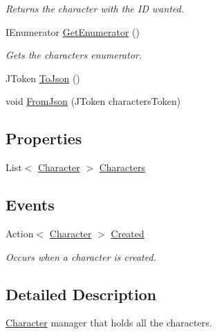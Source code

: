\begin{DoxyCompactItemize}
\begin{DoxyCompactList}\small\item\em Returns the character with the ID wanted. \end{DoxyCompactList}\item 
I\+Enumerator \hyperlink{class_project_porcupine_1_1_entities_1_1_character_manager_a2d75bb0449e9a7e74e43a1a9f4c91b10}{Get\+Enumerator} ()
\begin{DoxyCompactList}\small\item\em Gets the characters enumerator. \end{DoxyCompactList}\item 
J\+Token \hyperlink{class_project_porcupine_1_1_entities_1_1_character_manager_aa12ac490f3e9f2197831e50f291b50a3}{To\+Json} ()
\item 
void \hyperlink{class_project_porcupine_1_1_entities_1_1_character_manager_a06bf7980cdec23a5939d03f196839ccb}{From\+Json} (J\+Token characters\+Token)
\end{DoxyCompactItemize}
\subsection*{Properties}
\begin{DoxyCompactItemize}
\item 
List$<$ \hyperlink{class_project_porcupine_1_1_entities_1_1_character}{Character} $>$ \hyperlink{class_project_porcupine_1_1_entities_1_1_character_manager_a09c3aa1467a21d4ae1b671503f20d84d}{Characters}
\end{DoxyCompactItemize}
\subsection*{Events}
\begin{DoxyCompactItemize}
\item 
Action$<$ \hyperlink{class_project_porcupine_1_1_entities_1_1_character}{Character} $>$ \hyperlink{class_project_porcupine_1_1_entities_1_1_character_manager_a6de593fee27b425be723fd43231cc1fc}{Created}
\begin{DoxyCompactList}\small\item\em Occurs when a character is created. \end{DoxyCompactList}\end{DoxyCompactItemize}


\subsection{Detailed Description}
\hyperlink{class_project_porcupine_1_1_entities_1_1_character}{Character} manager that holds all the characters. 



